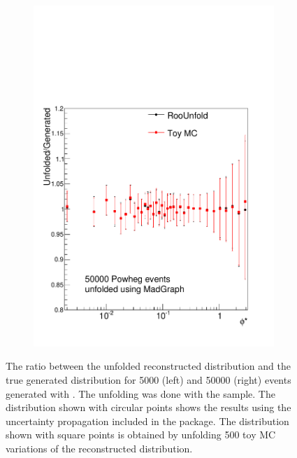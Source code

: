 \begin{figure}[!htbp]
\begin{subfigure}[b]{\SideBySidePlotWidth}
        \includegraphics[width=\textwidth]{figures/BinM_MP_50000.pdf}
        \caption{}
        \label{fig:unfolding_50000}
    \end{subfigure}
    \caption{
        The ratio between the unfolded reconstructed \phistar distribution and
        the true generated \phistar distribution for \num{5000} (left) and
        \num{50000} (right) \Ztoee events generated with \POWHEG. The unfolding
        was done with the \MADGRAPH sample. The distribution shown with
        circular points shows the results using the uncertainty propagation
        included in the \RooUnfold package. The distribution shown with square
        points is obtained by unfolding 500 toy MC variations of the
        reconstructed \phistar distribution.
    }
    \label{fig:toy_powheg_unfolding_results}
\end{figure}

